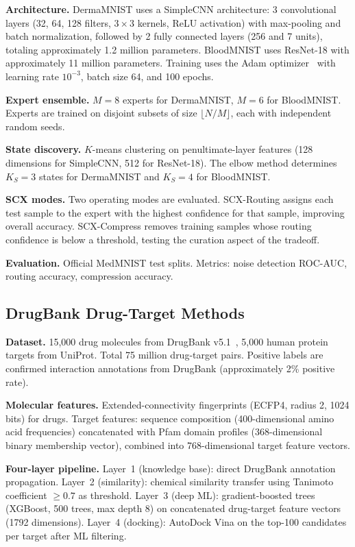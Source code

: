 \documentclass{article}
\begin{document}
\textbf{Architecture.} DermaMNIST uses a SimpleCNN architecture: 3 convolutional layers (32, 64, 128 filters, $3 \times 3$ kernels, ReLU activation) with max-pooling and batch normalization, followed by 2 fully connected layers (256 and 7 units), totaling approximately 1.2 million parameters. BloodMNIST uses ResNet-18 with approximately 11 million parameters. Training uses the Adam optimizer~\cite{kingma2015adam} with learning rate $10^{-3}$, batch size 64, and 100 epochs.

\textbf{Expert ensemble.} $M = 8$ experts for DermaMNIST, $M = 6$ for BloodMNIST. Experts are trained on disjoint subsets of size $\lfloor N/M \rfloor$, each with independent random seeds.

\textbf{State discovery.} $K$-means clustering on penultimate-layer features (128 dimensions for SimpleCNN, 512 for ResNet-18). The elbow method determines $K_S = 3$ states for DermaMNIST and $K_S = 4$ for BloodMNIST.

\textbf{SCX modes.} Two operating modes are evaluated. SCX-Routing assigns each test sample to the expert with the highest confidence for that sample, improving overall accuracy. SCX-Compress removes training samples whose routing confidence is below a threshold, testing the curation aspect of the tradeoff.

\textbf{Evaluation.} Official MedMNIST test splits. Metrics: noise detection ROC-AUC, routing accuracy, compression accuracy.

\subsection{DrugBank Drug-Target Methods}
\label{sec:methods_drug}

\textbf{Dataset.} 15,000 drug molecules from DrugBank v5.1~\cite{wishart2018drugbank}, 5,000 human protein targets from UniProt. Total 75 million drug-target pairs. Positive labels are confirmed interaction annotations from DrugBank (approximately 2\% positive rate).

\textbf{Molecular features.} Extended-connectivity fingerprints (ECFP4, radius 2, 1024 bits) for drugs. Target features: sequence composition (400-dimensional amino acid frequencies) concatenated with Pfam domain profiles (368-dimensional binary membership vector), combined into 768-dimensional target feature vectors.

\textbf{Four-layer pipeline.} Layer~1 (knowledge base): direct DrugBank annotation propagation. Layer~2 (similarity): chemical similarity transfer using Tanimoto coefficient $\geq 0.7$ as threshold. Layer~3 (deep ML): gradient-boosted trees (XGBoost, 500 trees, max depth 8) on concatenated drug-target feature vectors (1792 dimensions). Layer~4 (docking): AutoDock Vina on the top-100 candidates per target after ML filtering.
\end{document}
